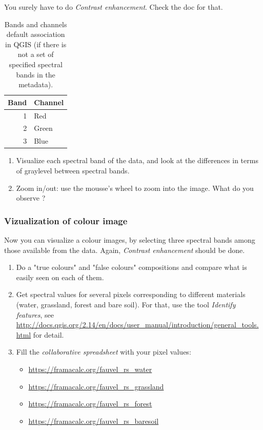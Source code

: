 \documentclass[a4paper,11pt,DIV=18]{scrartcl}
\begin{document}
You surely have to do \emph{Contrast enhancement}. Check the doc for that.

\begin{table}[htbp]
\caption{\label{tab:orgfbd28cd}
Bands and channels default association in QGIS (if there is not a set of specified spectral bands in the metadata).}
\centering
\begin{tabular}{rl}
\toprule
Band & Channel\\
\midrule
1 & Red\\
2 & Green\\
3 & Blue\\
\bottomrule
\end{tabular}
\end{table}

\begin{work}
\begin{enumerate}
\item Visualize  each  spectral  band  of the  data,  and  look  at  the
differences in terms of graylevel between spectral bands.
\item Zoom in/out: use the mousse's wheel to zoom into the image. What do
you observe ?
\end{enumerate}
\end{work}
\subsubsection{Vizualization of colour image}
\label{sec:orgc6b3fd6}
Now you  can visualize  a colour images,  by selecting  three spectral
bands among those available  from the data. Again, \emph{Contrast
enhancement} should be done.

\begin{work}
\begin{enumerate}
\item Do a "true colours" and "false colours" compositions and compare what
is easily seen on each of them.
\item Get spectral  values for several pixels  corresponding to different
materials  (water,  grassland,  forest  and bare  soil). For that,
use the tool \emph{Identify features}, see
\url{http://docs.qgis.org/2.14/en/docs/user\_manual/introduction/general\_tools.html}
for detail.
\item Fill  the \emph{collaborative spreadsheet}  with your pixel values:
\begin{itemize}
\item \url{https://framacalc.org/fauvel\_rs\_water}
\item \url{https://framacalc.org/fauvel\_rs\_grassland}
\item \url{https://framacalc.org/fauvel\_rs\_forest}
\item \url{https://framacalc.org/fauvel\_rs\_baresoil}
\end{itemize}
\end{enumerate}
\end{work}
\end{document}
